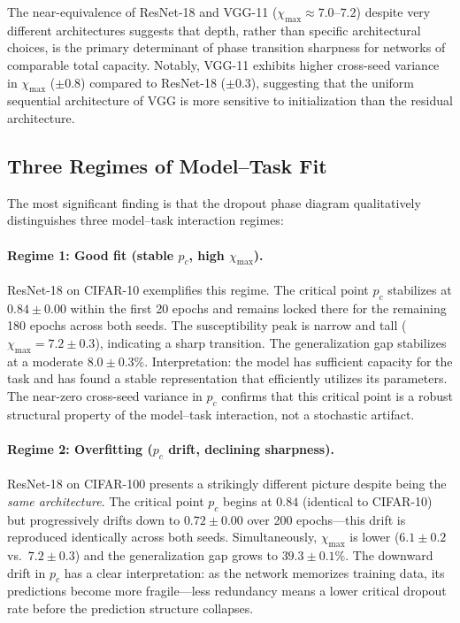 \documentclass{article}
\begin{document}
The near-equivalence of ResNet-18 and VGG-11 ($\chi_{\max} \approx 7.0$--$7.2$) despite very different architectures suggests that depth, rather than specific architectural choices, is the primary determinant of phase transition sharpness for networks of comparable total capacity. Notably, VGG-11 exhibits higher cross-seed variance in $\chi_{\max}$ ($\pm 0.8$) compared to ResNet-18 ($\pm 0.3$), suggesting that the uniform sequential architecture of VGG is more sensitive to initialization than the residual architecture.

\subsection{Three Regimes of Model--Task Fit}
\label{sec:regimes}

The most significant finding is that the dropout phase diagram qualitatively distinguishes three model--task interaction regimes:

\paragraph{Regime 1: Good fit (stable $p_c$, high $\chi_{\max}$).}
ResNet-18 on CIFAR-10 exemplifies this regime. The critical point $p_c$ stabilizes at $0.84 \pm 0.00$ within the first 20 epochs and remains locked there for the remaining 180 epochs across both seeds. The susceptibility peak is narrow and tall ($\chi_{\max} = 7.2 \pm 0.3$), indicating a sharp transition. The generalization gap stabilizes at a moderate $8.0 \pm 0.3\%$. Interpretation: the model has sufficient capacity for the task and has found a stable representation that efficiently utilizes its parameters. The near-zero cross-seed variance in $p_c$ confirms that this critical point is a robust structural property of the model--task interaction, not a stochastic artifact.

\paragraph{Regime 2: Overfitting ($p_c$ drift, declining sharpness).}
ResNet-18 on CIFAR-100 presents a strikingly different picture despite being the \emph{same architecture}. The critical point $p_c$ begins at $0.84$ (identical to CIFAR-10) but progressively drifts down to $0.72 \pm 0.00$ over 200 epochs---this drift is reproduced identically across both seeds. Simultaneously, $\chi_{\max}$ is lower ($6.1 \pm 0.2$ vs.\ $7.2 \pm 0.3$) and the generalization gap grows to $39.3 \pm 0.1\%$. The downward drift in $p_c$ has a clear interpretation: as the network memorizes training data, its predictions become more fragile---less redundancy means a lower critical dropout rate before the prediction structure collapses.
\end{document}
